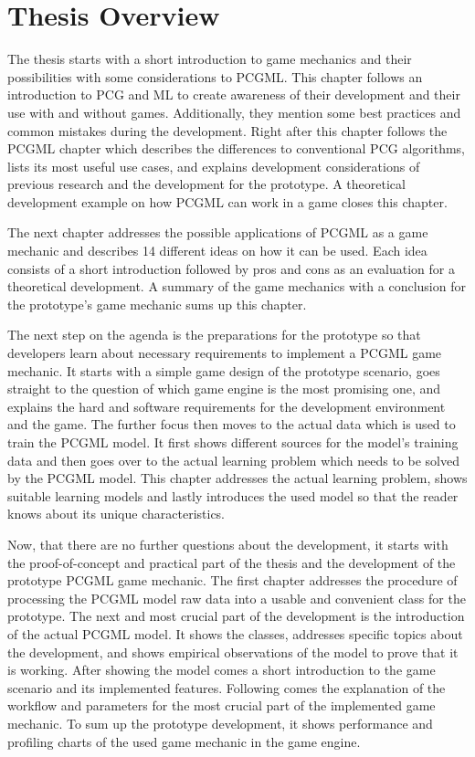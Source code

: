 \documentclass[MGS,Master,english]{twbook}%
\begin{document}
\section{Thesis Overview}
The thesis starts with a short introduction to game mechanics and their possibilities with some considerations to \ac{PCGML}. This chapter follows an introduction to \ac{PCG} and \ac{ML} to create awareness of their development and their use with and without games. Additionally, they mention some best practices and common mistakes during the development. Right after this chapter follows the \ac{PCGML} chapter which describes the differences to conventional \ac{PCG} algorithms, lists its most useful use cases, and explains development considerations of previous research and the development for the prototype. A theoretical development example on how \ac{PCGML} can work in a game closes this chapter.

The next chapter addresses the possible applications of \ac{PCGML} as a game mechanic and describes 14 different ideas on how it can be used. Each idea consists of a short introduction followed by pros and cons as an evaluation for a theoretical development. A summary of the game mechanics with a conclusion for the prototype's game mechanic sums up this chapter.

The next step on the agenda is the preparations for the prototype so that developers learn about necessary requirements to implement a \ac{PCGML} game mechanic. It starts with a simple game design of the prototype scenario, goes straight to the question of which game engine is the most promising one, and explains the hard and software requirements for the development environment and the game. The further focus then moves to the actual data which is used to train the \ac{PCGML} model. It first shows different sources for the model's training data and then goes over to the actual learning problem which needs to be solved by the \ac{PCGML} model. This chapter addresses the actual learning problem, shows suitable learning models and lastly introduces the used model so that the reader knows about its unique characteristics.

Now, that there are no further questions about the development, it starts with the proof-of-concept and practical part of the thesis and the development of the prototype \ac{PCGML} game mechanic. The first chapter addresses the procedure of processing the \ac{PCGML} model raw data into a usable and convenient class for the prototype. The next and most crucial part of the development is the introduction of the actual \ac{PCGML} model. It shows the classes, addresses specific topics about the development, and shows empirical observations of the model to prove that it is working. After showing the model comes a short introduction to the game scenario and its implemented features. Following comes the explanation of the workflow and parameters for the most crucial part of the implemented game mechanic. To sum up the prototype development, it shows performance and profiling charts of the used game mechanic in the game engine.
\end{document}
